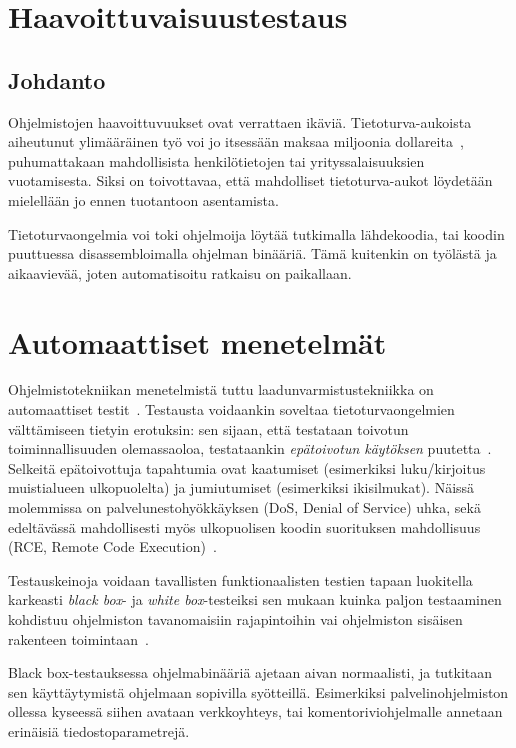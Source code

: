 \section{Haavoittuvaisuustestaus}

\subsection{Johdanto}
Ohjelmistojen haavoittuvuukset ovat verrattaen ikäviä.
Tietoturva-aukoista aiheutunut ylimääräinen työ voi jo itsessään maksaa miljoonia dollareita~\cite{SageArtikkeli},
puhumattakaan mahdollisista henkilötietojen tai yrityssalaisuuksien vuotamisesta.
Siksi on toivottavaa, että mahdolliset tietoturva-aukot löydetään mielellään jo ennen tuotantoon asentamista.

Tietoturvaongelmia voi toki ohjelmoija löytää tutkimalla lähdekoodia,
tai koodin puuttuessa disassembloimalla ohjelman binääriä.
Tämä kuitenkin on työlästä ja aikaavievää, joten automatisoitu ratkaisu on paikallaan.

\section{Automaattiset menetelmät}

Ohjelmistotekniikan menetelmistä tuttu laadunvarmistustekniikka on automaattiset testit~\cite{Sommerville}.
Testausta voidaankin soveltaa tietoturvaongelmien välttämiseen tietyin erotuksin:
sen sijaan, että testataan toivotun toiminnallisuuden olemassaoloa,
testataankin \emph{epätoivotun käytöksen} puutetta~\cite{OuluBrowser}.
Selkeitä epätoivottuja tapahtumia ovat kaatumiset (esimerkiksi luku/kirjoitus muistialueen ulkopuolelta) ja jumiutumiset (esimerkiksi ikisilmukat).
Näissä molemmissa on palvelunestohyökkäyksen (DoS, Denial of Service) uhka,
sekä edeltävässä mahdollisesti myös ulkopuolisen koodin suorituksen mahdollisuus (RCE, Remote Code Execution)~\cite{JokuLahdeTahan}.

Testauskeinoja voidaan tavallisten funktionaalisten testien tapaan luokitella karkeasti \emph{black box}- ja \emph{white box}-testeiksi sen mukaan kuinka paljon
testaaminen kohdistuu ohjelmiston tavanomaisiin rajapintoihin vai ohjelmiston sisäisen rakenteen toimintaan~\cite{Sommerville}.

Black box-testauksessa ohjelmabinääriä ajetaan aivan normaalisti, ja tutkitaan sen käyttäytymistä ohjelmaan sopivilla syötteillä.
Esimerkiksi palvelinohjelmiston ollessa kyseessä siihen avataan verkkoyhteys,
tai komentoriviohjelmalle annetaan erinäisiä tiedostoparametrejä.

